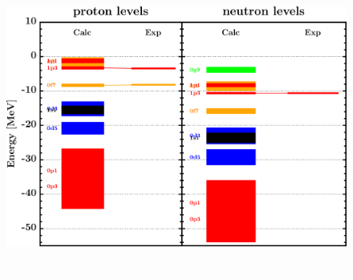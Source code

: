 \documentclass[twocolumn,secnumarabic,amssymb, nobibnotes, aps, prl,
superscriptaddress, nobalancelastpage]{revtex4}
\begin{document}
\begin{figure}[!htb]
\begin{minipage}{0.4\linewidth}
        \label{DOM_ni58_chargeDensity}
    \end{minipage}
    \begin{minipage}{0.35\linewidth}
        \centering
        \includegraphics[width=\linewidth]{figures/ni58_SPLevels.png}
        \label{DOM_ni58_SPLevels}
    \end{minipage}
    \begin{minipage}{0.4\linewidth}
        \centering
        \includegraphics[width=\linewidth]{figures/ni58_RMSRadius.png}

\end{minipage}
\end{figure}
\end{document}
